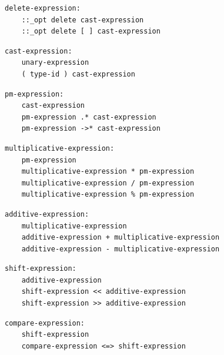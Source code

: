 \noindent\textbf{\texttt{}}\par
\begin{lstlisting}
delete-expression:
    ::_opt delete cast-expression
    ::_opt delete [ ] cast-expression
\end{lstlisting}

\noindent\textbf{\texttt{}}\par
\begin{lstlisting}
cast-expression:
    unary-expression
    ( type-id ) cast-expression
\end{lstlisting}

\noindent\textbf{\texttt{}}\par
\begin{lstlisting}
pm-expression:
    cast-expression
    pm-expression .* cast-expression
    pm-expression ->* cast-expression
\end{lstlisting}

\noindent\textbf{\texttt{}}\par
\begin{lstlisting}
multiplicative-expression:
    pm-expression
    multiplicative-expression * pm-expression
    multiplicative-expression / pm-expression
    multiplicative-expression % pm-expression
\end{lstlisting}

\noindent\textbf{\texttt{}}\par
\begin{lstlisting}
additive-expression:
    multiplicative-expression
    additive-expression + multiplicative-expression
    additive-expression - multiplicative-expression
\end{lstlisting}

\noindent\textbf{\texttt{}}\par
\begin{lstlisting}
shift-expression:
    additive-expression
    shift-expression << additive-expression
    shift-expression >> additive-expression
\end{lstlisting}

\noindent\textbf{\texttt{}}\par
\begin{lstlisting}
compare-expression:
    shift-expression
    compare-expression <=> shift-expression
\end{lstlisting}


